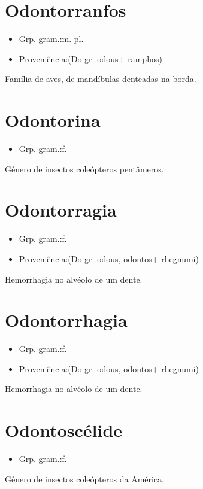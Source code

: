 \section{Odontorranfos}
\begin{itemize}
\item {Grp. gram.:m. pl.}
\end{itemize}
\begin{itemize}
\item {Proveniência:(Do gr. \textunderscore odous\textunderscore  + \textunderscore ramphos\textunderscore )}
\end{itemize}
Família de aves, de mandíbulas denteadas na borda.
\section{Odontorina}
\begin{itemize}
\item {Grp. gram.:f.}
\end{itemize}
Gênero de insectos coleópteros pentâmeros.
\section{Odontorragia}
\begin{itemize}
\item {Grp. gram.:f.}
\end{itemize}
\begin{itemize}
\item {Proveniência:(Do gr. \textunderscore odous\textunderscore , \textunderscore odontos\textunderscore  + \textunderscore rhegnumi\textunderscore )}
\end{itemize}
Hemorrhagia no alvéolo de um dente.
\section{Odontorrhagia}
\begin{itemize}
\item {Grp. gram.:f.}
\end{itemize}
\begin{itemize}
\item {Proveniência:(Do gr. \textunderscore odous\textunderscore , \textunderscore odontos\textunderscore  + \textunderscore rhegnumi\textunderscore )}
\end{itemize}
Hemorrhagia no alvéolo de um dente.
\section{Odontoscélide}
\begin{itemize}
\item {Grp. gram.:f.}
\end{itemize}
Gênero de insectos coleópteros da América.
